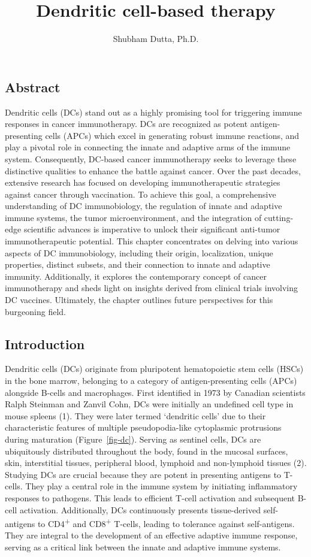 \documentclass[
]{article}
\title{Dendritic cell-based therapy}
\author{Shubham Dutta, Ph.D.}
\affil{%
                  University of Massachusetts Medical School
              }
\date{}
\begin{document}
\maketitle

\subsection{Abstract}\label{abstract}

Dendritic cells (DCs) stand out as a highly promising tool for
triggering immune responses in cancer immunotherapy. DCs are recognized
as potent antigen-presenting cells (APCs) which excel in generating
robust immune reactions, and play a pivotal role in connecting the
innate and adaptive arms of the immune system. Consequently, DC-based
cancer immunotherapy seeks to leverage these distinctive qualities to
enhance the battle against cancer. Over the past decades, extensive
research has focused on developing immunotherapeutic strategies against
cancer through vaccination. To achieve this goal, a comprehensive
understanding of DC immunobiology, the regulation of innate and adaptive
immune systems, the tumor microenvironment, and the integration of
cutting-edge scientific advances is imperative to unlock their
significant anti-tumor immunotherapeutic potential. This chapter
concentrates on delving into various aspects of DC immunobiology,
including their origin, localization, unique properties, distinct
subsets, and their connection to innate and adaptive immunity.
Additionally, it explores the contemporary concept of cancer
immunotherapy and sheds light on insights derived from clinical trials
involving DC vaccines. Ultimately, the chapter outlines future
perspectives for this burgeoning field.

\subsection{Introduction}\label{introduction}

Dendritic cells (DCs) originate from pluripotent hematopoietic stem
cells (HSCs) in the bone marrow, belonging to a category of
antigen-presenting cells (APCs) alongside B-cells and macrophages. First
identified in 1973 by Canadian scientists Ralph Steinman and Zanvil
Cohn, DCs were initially an undefined cell type in mouse spleens (1).
They were later termed `dendritic cells' due to their characteristic
features of multiple pseudopodia-like cytoplasmic protrusions during
maturation (Figure~\ref{fig-dc}). Serving as sentinel cells, DCs are
ubiquitously distributed throughout the body, found in the mucosal
surfaces, skin, interstitial tissues, peripheral blood, lymphoid and
non-lymphoid tissues (2). Studying DCs are crucial because they are
potent in presenting antigens to T-cells. They play a central role in
the immune system by initiating inflammatory responses to pathogens.
This leads to efficient T-cell activation and subsequent B-cell
activation. Additionally, DCs continuously presents tissue-derived
self-antigens to CD4\textsuperscript{+} and CD8\textsuperscript{+}
T-cells, leading to tolerance against self-antigens. They are integral
to the development of an effective adaptive immune response, serving as
a critical link between the innate and adaptive immune systems.
\end{document}
